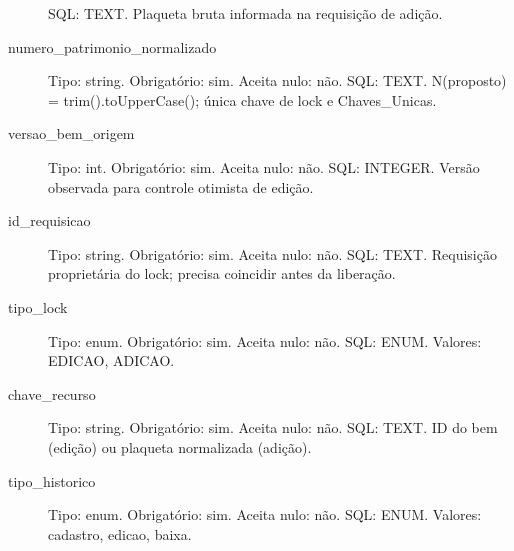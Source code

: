\begin{description}
SQL: TEXT.
Plaqueta bruta informada na requisição de adição.
\item[numero\_patrimonio\_normalizado] Tipo: string. Obrigatório: sim. Aceita nulo: não.
SQL: TEXT.
N(proposto) = trim().toUpperCase(); única chave de lock e Chaves\_Unicas.
\item[versao\_bem\_origem] Tipo: int. Obrigatório: sim. Aceita nulo: não.
SQL: INTEGER.
Versão observada para controle otimista de edição.
\item[id\_requisicao] Tipo: string. Obrigatório: sim. Aceita nulo: não.
SQL: TEXT.
Requisição proprietária do lock; precisa coincidir antes da liberação.
\item[tipo\_lock] Tipo: enum. Obrigatório: sim. Aceita nulo: não.
SQL: ENUM.
Valores: EDICAO, ADICAO.
\item[chave\_recurso] Tipo: string. Obrigatório: sim. Aceita nulo: não.
SQL: TEXT.
ID do bem (edição) ou plaqueta normalizada (adição).
\item[tipo\_historico] Tipo: enum. Obrigatório: sim. Aceita nulo: não.
SQL: ENUM.
Valores: cadastro, edicao, baixa.
\end{description}

